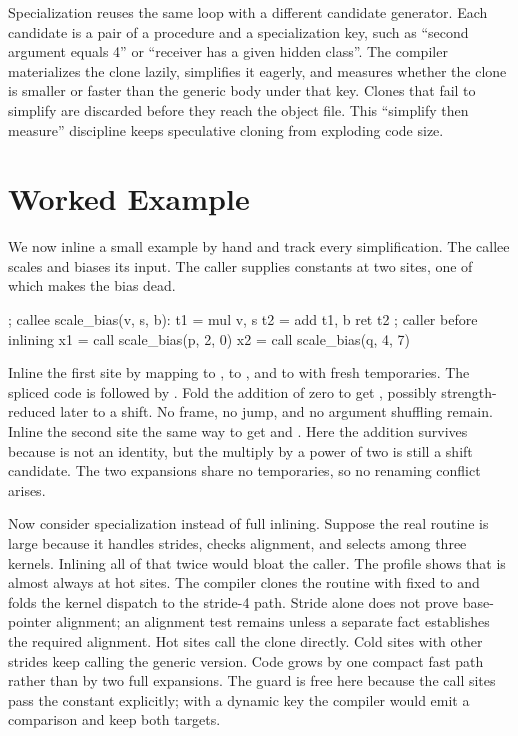 Specialization reuses the same loop with a different candidate generator.
Each candidate is a pair of a procedure and a specialization key, such as \enquote{second argument equals 4} or \enquote{receiver has a given hidden class}.
The compiler materializes the clone lazily, simplifies it eagerly, and measures whether the clone is smaller or faster than the generic body under that key.
Clones that fail to simplify are discarded before they reach the object file.
This \enquote{simplify then measure} discipline keeps speculative cloning from exploding code size.

\section{Worked Example}\label{sec:ch23-worked}

We now inline a small example by hand and track every simplification.
The callee scales and biases its input.
The caller supplies constants at two sites, one of which makes the bias dead.
\begin{irlisting}
; callee
scale_bias(v, s, b):
  t1 = mul v, s
  t2 = add t1, b
  ret t2
; caller before inlining
x1 = call scale_bias(p, 2, 0)
x2 = call scale_bias(q, 4, 7)
\end{irlisting}
Inline the first site by mapping  to ,  to , and  to  with fresh temporaries.
The spliced code is  followed by .
Fold the addition of zero to get , possibly strength-reduced later to a shift.
No frame, no jump, and no argument shuffling remain.
Inline the second site the same way to get  and .
Here the addition survives because  is not an identity, but the multiply by a power of two is still a shift candidate.
The two expansions share no temporaries, so no renaming conflict arises.

Now consider specialization instead of full inlining.
Suppose the real routine is large because it handles strides, checks alignment, and selects among three kernels.
Inlining all of that twice would bloat the caller.
The profile shows that  is almost always  at hot sites.
The compiler clones the routine with  fixed to  and folds the kernel dispatch to the stride-4 path.
Stride alone does not prove base-pointer alignment; an alignment test remains unless a separate fact establishes the required alignment.
Hot sites call the clone directly.
Cold sites with other strides keep calling the generic version.
Code grows by one compact fast path rather than by two full expansions.
The guard is free here because the call sites pass the constant explicitly; with a dynamic key the compiler would emit a comparison and keep both targets.

